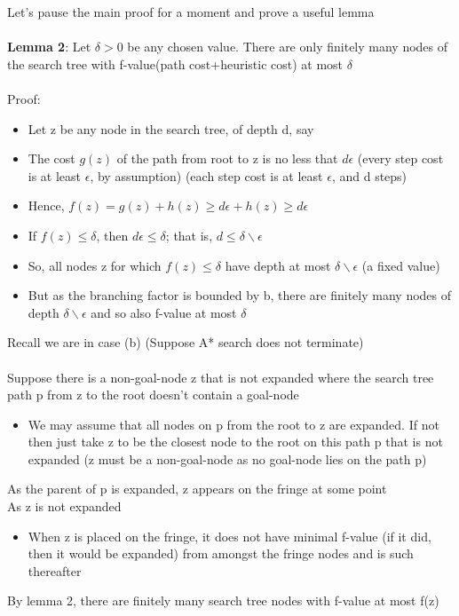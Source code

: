 \documentclass{article}[18pt]
\begin{document}
Let's pause the main proof for a moment and prove a useful lemma\\
\\
\textbf{Lemma 2}: Let $\delta>0$ be any chosen value. There are only finitely many nodes of the search tree with f-value(path cost+heuristic cost) at most $\delta$\\
\\
Proof: 
\begin{itemize}
	\item Let z be any node in the search tree, of depth d, say
	\item The cost $g(z)$ of the path from root to z is no less that $d\epsilon$ (every step cost is at least $\epsilon$, by assumption) (each step cost is at least $\epsilon$, and d steps)
	\item Hence, $f(z)=g(z)+h(z)\geqslant d\epsilon + h(z) \geqslant d\epsilon$
	\item If $f(z)\leqslant \delta$, then $d\epsilon \leqslant \delta$; that is, $d\leqslant \delta \backslash \epsilon$
	\item So, all nodes z for which $f(z)\leqslant \delta$ have depth at most $\delta \backslash \epsilon$ (a fixed value)
	\item But as the branching factor is bounded by b, there are finitely many nodes of depth $\delta \backslash \epsilon$ and so also f-value at most $\delta$
\end{itemize}
Recall we are in case (b) (Suppose A* search does not terminate)\\
\\
Suppose there is a non-goal-node z that is not expanded where the search tree path p from z to the root doesn't contain a goal-node
\begin{itemize}
	\item We may assume that all nodes on p from the root to z are expanded. If not then just take z to be the closest node to the root on this path p that is not expanded (z must be a non-goal-node as no goal-node lies on the path p)
\end{itemize}
As the parent of p is expanded, z appears on the fringe at some point\\
As z is not expanded
\begin{itemize}
	\item When z is placed on the fringe, it does not have minimal f-value (if it did, then it would be expanded) from amongst the fringe nodes and is such thereafter
\end{itemize}
By lemma 2, there are finitely many search tree nodes with f-value at most f(z)
\end{document}
